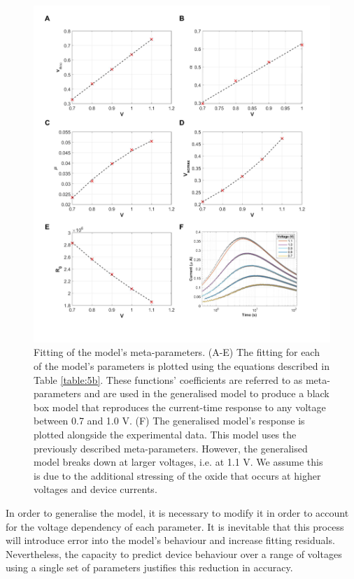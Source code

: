 \begin{figure}[htbp!] 
    \centering    
    \includegraphics[width=1\textwidth]{Chapter5/Figs/f.png}
    \caption[Fitting of the model's meta-parameters.]{Fitting of the model's meta-parameters. (A-E) The fitting for each of the model's parameters is plotted using the equations described in Table \ref{table:5b}. These functions' coefficients are referred to as meta-parameters and are used in the generalised model to produce a black box model that reproduces the current-time response to any voltage between 0.7 and 1.0 V. (F) The generalised model's response is plotted alongside the experimental data. This model uses the previously described meta-parameters. However, the generalised model breaks down at larger voltages, i.e. at 1.1 V. We assume this is due to the additional stressing of the oxide that occurs at higher voltages and device currents.}
    \label{fig:5f}
\end{figure}

\noindent In order to generalise the model, it is necessary to modify it in order to account for the voltage dependency of each parameter. It is inevitable that this process will introduce error into the model's behaviour and increase fitting residuals. Nevertheless, the capacity to predict device behaviour over a range of voltages using a single set of parameters justifies this reduction in accuracy. \\

